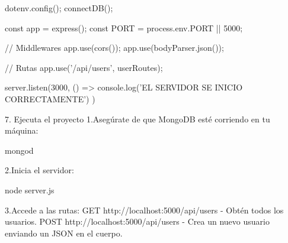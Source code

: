 dotenv.config();
connectDB();

const app = express();
const PORT = process.env.PORT || 5000;

// Middlewares
app.use(cors());
app.use(bodyParser.json());

// Rutas
app.use('/api/users', userRoutes);

server.listen(3000, () => {
    console.log('EL SERVIDOR SE INICIO CORRECTAMENTE')
})





7. Ejecuta el proyecto
1.Asegúrate de que MongoDB esté corriendo en tu máquina:

mongod

2.Inicia el servidor:

node server.js


3.Accede a las rutas:
GET http://localhost:5000/api/users - Obtén todos los usuarios.
POST http://localhost:5000/api/users - Crea un nuevo usuario enviando un JSON en el cuerpo.







